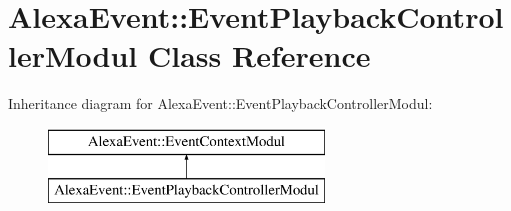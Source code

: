 \hypertarget{classAlexaEvent_1_1EventPlaybackControllerModul}{}\section{Alexa\+Event\+:\+:Event\+Playback\+Controller\+Modul Class Reference}
\label{classAlexaEvent_1_1EventPlaybackControllerModul}
Inheritance diagram for Alexa\+Event\+:\+:Event\+Playback\+Controller\+Modul\+:\begin{figure}[H]
\begin{center}
\leavevmode
\includegraphics[height=2.000000cm]{d8/d32/classAlexaEvent_1_1EventPlaybackControllerModul}
\end{center}
\end{figure}
